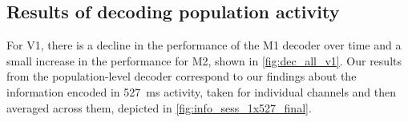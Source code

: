 \subsection{Results of decoding population activity}


For \ac{V1}, there is a decline in the performance of the \ac{M1} decoder over time and a small increase in the performance for \ac{M2}, shown in \autoref{fig:dec_all_v1}.
Our results from the population-level decoder correspond to our findings about the information encoded in \SI{527}{\milli\second} activity, taken for individual channels and then averaged across them, depicted in \autoref{fig:info_sess_1x527_final}.

%
%

%
%

